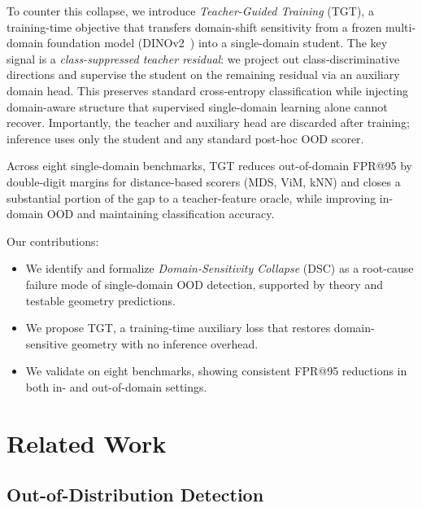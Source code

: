 \documentclass[runningheads]{llncs}
\begin{document}
To counter this collapse, we introduce \emph{Teacher-Guided Training} (TGT), a training-time objective that transfers domain-shift sensitivity from a frozen multi-domain foundation model (DINOv2~\cite{Oquab2024dinov2}) into a single-domain student. The key signal is a \emph{class-suppressed teacher residual}: we project out class-discriminative directions and supervise the student on the remaining residual via an auxiliary domain head. This preserves standard cross-entropy classification while injecting domain-aware structure that supervised single-domain learning alone cannot recover. Importantly, the teacher and auxiliary head are discarded after training; inference uses only the student and any standard post-hoc OOD scorer.

Across eight single-domain benchmarks, TGT reduces out-of-domain FPR@95 by double-digit margins for distance-based scorers (MDS, ViM, kNN) and closes a substantial portion of the gap to a teacher-feature oracle, while improving in-domain OOD and maintaining classification accuracy.

\noindent Our contributions:
\begin{itemize}
  \item We identify and formalize \emph{Domain-Sensitivity Collapse} (DSC) as a root-cause failure mode of single-domain OOD detection, supported by theory and testable geometry predictions.
  \item We propose TGT, a training-time auxiliary loss that restores domain-sensitive geometry with no inference overhead.
  \item We validate on eight benchmarks, showing consistent FPR@95 reductions in both in- and out-of-domain settings.
\end{itemize}


\section{Related Work}
\label{sec:related}

\subsection{Out-of-Distribution Detection}
\label{sec:related:ood}
\end{document}
